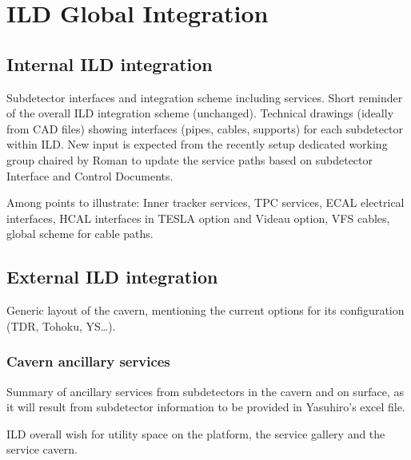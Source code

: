 \chapter{ILD Global Integration}

\vspace{2cm}

\section{Internal ILD integration}

Subdetector interfaces and integration scheme including services. Short reminder of the overall ILD integration scheme (unchanged). Technical drawings (ideally from CAD files) showing interfaces (pipes, cables, supports) for each subdetector within ILD. New input is expected from the recently setup dedicated working group chaired by Roman to update the service paths based on subdetector Interface and Control Documents.

Among points to illustrate: Inner tracker services, TPC services, ECAL electrical interfaces, HCAL interfaces in TESLA option and Videau option, VFS cables, global scheme for cable paths.   

\vspace{2cm}

\section{External ILD integration}

Generic layout of the cavern, mentioning the current options for its configuration (TDR, Tohoku, YS…).

\vspace{2cm}

\subsection{Cavern ancillary services}

Summary of ancillary services from subdetectors in the cavern and on surface, as it will result from subdetector information to be provided in 
Yasuhiro’s excel file.

ILD overall wish for utility space
on the platform, the service gallery 
and the service cavern.

\vspace{2cm}

